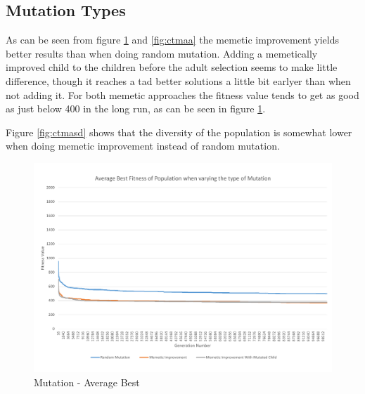 \clearpage

\subsection{Mutation Types} %
\label{sub:mutation_types}

As can be seen from figure \ref{fig:ctmab} and \ref{fig:ctmaa} the memetic improvement yields better results than when doing random mutation. Adding a memetically improved child to the children before the adult selection seems to make little difference, though it reaches a tad better solutions a little bit earlyer than when not adding it. For both memetic approaches the fitness value tends to get as good as just below 400 in the long run, as can be seen in figure \ref{fig:ctmab}.

Figure \ref{fig:ctmasd} shows that the diversity of the population is somewhat lower when doing memetic improvement instead of random mutation.

\begin{landscape}
\begin{figure}[thbp]
	\centerline{\includegraphics[height=0.945\textwidth]{figures/CircleTests/Mutation/CircleTestMutationAverageBest.pdf}}
	\caption{Mutation - Average Best}
	\label{fig:ctmab}
\end{figure}
\end{landscape}

